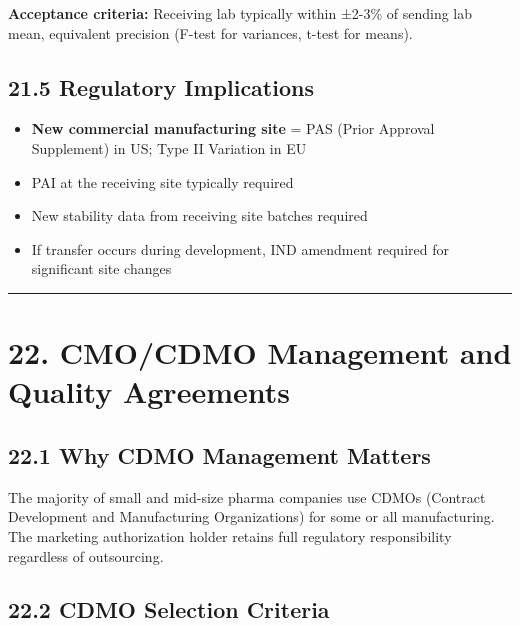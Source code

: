 \documentclass[
  11pt,
  a4paper,
]{report}
\providecommand{\tightlist}{%
  \setlength{\itemsep}{0pt}\setlength{\parskip}{0pt}}
\begin{document}
\textbf{Acceptance criteria:} Receiving lab typically within ±2-3\% of
sending lab mean, equivalent precision (F-test for variances, t-test for
means).

\hypertarget{regulatory-implications}{%
\subsection{21.5 Regulatory
Implications}\label{regulatory-implications}}

\begin{itemize}
\tightlist
\item
  \textbf{New commercial manufacturing site} = PAS (Prior Approval
  Supplement) in US; Type II Variation in EU
\item
  PAI at the receiving site typically required
\item
  New stability data from receiving site batches required
\item
  If transfer occurs during development, IND amendment required for
  significant site changes
\end{itemize}

\begin{center}\rule{0.5\linewidth}{0.5pt}\end{center}

\hypertarget{cmocdmo-management-and-quality-agreements}{%
\section{22. CMO/CDMO Management and Quality
Agreements}\label{cmocdmo-management-and-quality-agreements}}

\hypertarget{why-cdmo-management-matters}{%
\subsection{22.1 Why CDMO Management
Matters}\label{why-cdmo-management-matters}}

The majority of small and mid-size pharma companies use CDMOs (Contract
Development and Manufacturing Organizations) for some or all
manufacturing. The marketing authorization holder retains full
regulatory responsibility regardless of outsourcing.

\hypertarget{cdmo-selection-criteria}{%
\subsection{22.2 CDMO Selection
Criteria}\label{cdmo-selection-criteria}}
\end{document}
